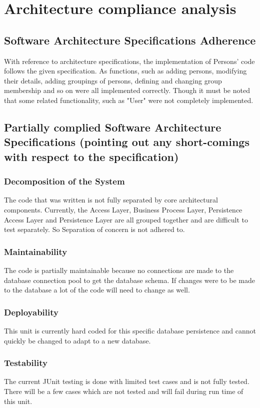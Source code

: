 \documentclass{article}
\begin{document}
\newpage

\section{Architecture compliance analysis}
\subsection{Software Architecture Specifications Adherence}
With reference to architecture specifications, the implementation of Persons' code follows the given specification. As functions, such as adding persons, modifying their details, adding groupings of persons, defining and changing group membership and so on were all implemented correctly. Though it must be noted that some related functionality, such as "User" were not completely implemented.

\subsection{Partially complied Software Architecture Specifications (pointing out any short-comings with respect to the specification)}

\subsubsection{Decomposition of the System}
The code that was written is not fully separated by core architectural components. Currently, the Access Layer, Business Process Layer, Persistence Access Layer and Persistence Layer are all grouped together and are difficult to test separately. So Separation of concern is not adhered to.

\subsubsection{Maintainability}
The code is partially maintainable because no connections are made to the database connection pool to get the database schema. If changes were to be made to the database a lot of the code will need to change as well.

\subsubsection{Deployability}
This unit is currently hard coded for this specific database persistence and cannot quickly be changed to adapt to a new database.

\subsubsection{Testability}
The current JUnit testing is done with limited test cases and is not fully tested. There will be a few cases which are not tested and will fail during run time of this unit.
\end{document}
